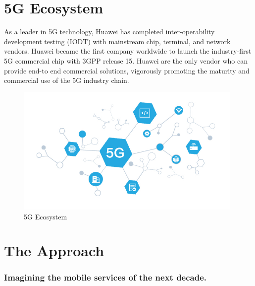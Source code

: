 \section{5G Ecosystem}
{As a leader in 5G technology, Huawei has completed inter-operability development testing (IODT) with mainstream chip, terminal, and network vendors. Huawei became the first company worldwide to launch the industry-first 5G commercial chip with 3GPP release 15. Huawei are the only vendor who can provide end-to end commercial solutions, vigorously promoting the maturity and commercial use of the 5G industry chain.}

\begin{figure}
    \centering
    \includegraphics[width=11cm]{Images/lastimg.png}
    \caption{5G Ecosystem}
    \label{fig:my_label}
\end{figure}

\section{The Approach}
\subsubsection{Imagining the mobile services of the next decade.}

